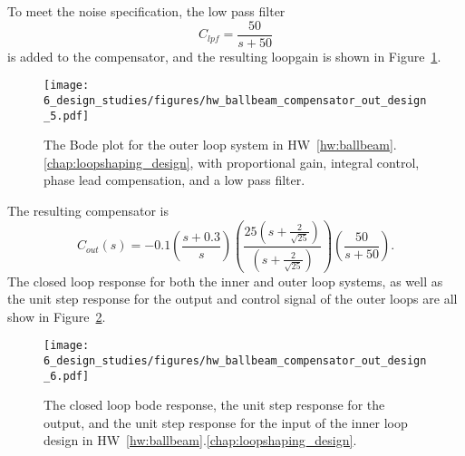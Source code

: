 To meet the noise specification, the low pass filter
\[
C_{lpf} = \frac{50}{s+50}
\]
is added to the compensator, and the resulting loopgain is shown in Figure~\ref{fig:hw_ballbeam_compensator_out_design_5}.
\begin{figure}[H]
   \centering
   \texttt{[image: 6\_design\_studies/figures/hw\_ballbeam\_compensator\_out\_design\_5.pdf]}
   \caption{The Bode plot for the outer loop system in HW~\ref{hw:ballbeam}.\ref{chap:loopshaping_design}, with proportional gain, integral control, phase lead compensation, and a low pass  filter.}
   \label{fig:hw_ballbeam_compensator_out_design_5}
\end{figure}
The resulting compensator is
\[
C_{out}(s) = -0.1\left(\frac{s+0.3}{s}\right)\left(\frac{25(s+\frac{2}{\sqrt{25}})}{(s+\frac{2}{\sqrt{25}})}\right)\left(\frac{50}{s+50}\right).
\]
The closed loop response for both the inner and outer loop systems, 
as well as the unit step response for the output and control signal of the outer loops are all show in Figure~\ref{fig:hw_ballbeam_compensator_out_design_6}.
\begin{figure}[H]
   \centering
   \texttt{[image: 6\_design\_studies/figures/hw\_ballbeam\_compensator\_out\_design\_6.pdf]}
   \caption{The closed loop bode response, the unit step response for the output, and the unit step response for the input of the inner loop design in HW~\ref{hw:ballbeam}.\ref{chap:loopshaping_design}.}
   \label{fig:hw_ballbeam_compensator_out_design_6}
\end{figure}

